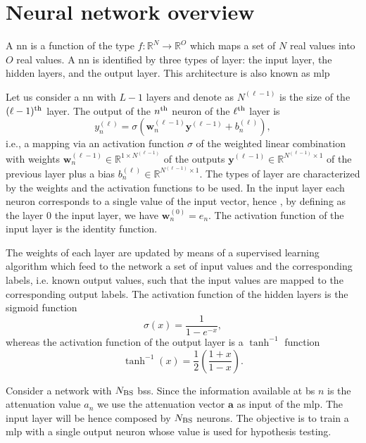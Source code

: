 \documentclass[draftcls,onecolumn,12pt]{IEEEtran}
\begin{document}
\section{Neural network overview}\label{sec:nn}

A \ac{nn} is a function of the type $f:\mathbb{R}^N \to \mathbb{R}^O$ which maps a set of $N$ real values into $O$ real values. A \ac{nn} is identified by three types of layer: the input layer, the hidden layers, and the output layer. This architecture is also known as \ac{mlp}

Let us consider a \ac{nn} with $L-1$ layers and denote as $N^{(\ell-1)}$ is the size of the $(\ell-1)^{\rm th}$ layer. The output of the $n^{\rm th}$ neuron of the $\ell^{\rm th}$ layer is
\begin{equation}\label{eq:nonLin}
y_n^{(\ell)} = \sigma\left( \bm{w}_n^{(\ell -1)}\bm{y}^{(\ell-1)}+b_n^{(\ell)} \right),
\end{equation}
i.e., a mapping via an activation function $\sigma$ of the weighted linear combination with weights $\bm{w}_n^{(\ell -1)}\in \mathbb{R}^{1\times N^{(\ell-1)}}$ of the outputs $\bm{y}^{(\ell-1)} \in \mathbb{R}^{N^{(\ell-1)} \times 1 }$ of the previous layer plus a bias $b_n^{(\ell)} \in \mathbb{R}^{N^{(\ell-1)} \times 1 }$. The types of layer are characterized by the weights and the activation functions to be used. In the input layer each neuron corresponds to a single value of the input vector, hence , by defining as the layer $0$ the input layer, we have $\bm{w}_n^{(0)}= e_n$. The activation function of the input layer is the identity function.

The weights of each layer are updated by means of a supervised learning algorithm which feed to the network a set of input values and the corresponding labels, i.e. known output values, such that the input values are mapped to the corresponding output labels. The activation function of the hidden layers is the sigmoid function
\begin{equation}
\sigma(x) = \frac{1}{1-e^{-x}},
\end{equation}
whereas the activation function of the output layer is a $\tanh^{-1}$ function
\begin{equation}
\tanh^{-1}(x) = \frac{1}{2} \left( \frac{1+x}{1-x} \right).
\end{equation}


Consider a network with $N_{\rm BS}$ \acp{bs}. Since the information available at \ac{bs} $n$ is the attenuation value $a_n$ we use the attenuation vector $\bm{a}$ as input of the \ac{mlp}. The input layer will be hence composed by $N_{\rm BS}$ neurons. The objective is to train a \ac{mlp} with a single output neuron whose value is used for hypothesis testing. 
\end{document}
